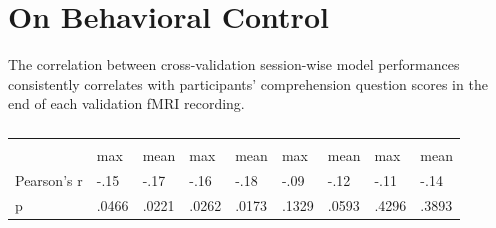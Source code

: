 
\section{On Behavioral Control}

The correlation between cross-validation session-wise model performances consistently correlates with participants' comprehension question scores in the end of each validation fMRI recording.

\begin{table}
    \centering
    \begin{tabularx}{\textwidth}{L  *{8}{l}}
     \\
    \toprule
    & & &  &  \\
    & max & mean & max & mean & max & mean & max & mean \\
    \toprule
    Pearson's r & -.15 & -.17 & -.16 & -.18 & -.09 & -.12 & -.11 & -.14 \\
    p & .0466 & .0221 & .0262 & .0173 & .1329 & .0593 & .4296 & .3893\\
\bottomrule
    
    \end{tabularx}
    \caption[Model Performance and Behavioral Question Score Correlation]{}
    \label{tab:behavioral}
    \end{table}

